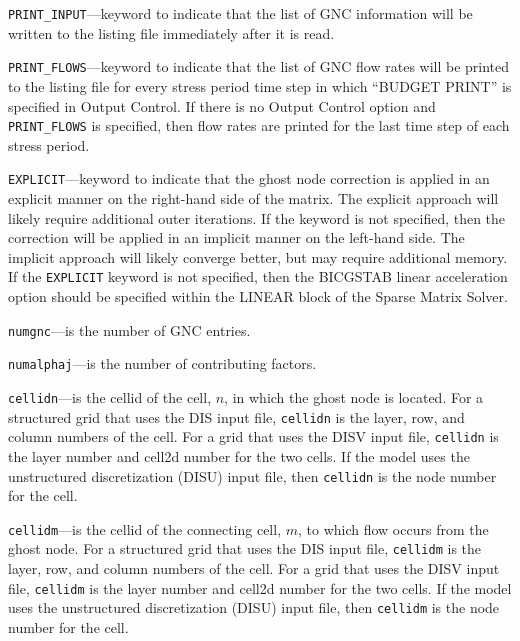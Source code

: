 
\item \texttt{PRINT\_INPUT}---keyword to indicate that the list of GNC information will be written to the listing file immediately after it is read.

\item \texttt{PRINT\_FLOWS}---keyword to indicate that the list of GNC flow rates will be printed to the listing file for every stress period time step in which ``BUDGET PRINT'' is specified in Output Control.  If there is no Output Control option and \texttt{PRINT\_FLOWS} is specified, then flow rates are printed for the last time step of each stress period.

\item \texttt{EXPLICIT}---keyword to indicate that the ghost node correction is applied in an explicit manner on the right-hand side of the matrix.  The explicit approach will likely require additional outer iterations.  If the keyword is not specified, then the correction will be applied in an implicit manner on the left-hand side.  The implicit approach will likely converge better, but may require additional memory.  If the \texttt{EXPLICIT} keyword is not specified, then the BICGSTAB linear acceleration option should be specified within the LINEAR block of the Sparse Matrix Solver.

\item \texttt{numgnc}---is the number of GNC entries.

\item \texttt{numalphaj}---is the number of contributing factors.

\item \texttt{cellidn}---is the cellid of the cell, $n$, in which the ghost node is located. For a structured grid that uses the DIS input file, \texttt{cellidn} is the layer, row, and column numbers of the cell.   For a grid that uses the DISV input file, \texttt{cellidn} is the layer number and cell2d number for the two cells.  If the model uses the unstructured discretization (DISU) input file, then \texttt{cellidn} is the node number for the cell.

\item \texttt{cellidm}---is the cellid of the connecting cell, $m$, to which flow occurs from the ghost node. For a structured grid that uses the DIS input file, \texttt{cellidm} is the layer, row, and column numbers of the cell.   For a grid that uses the DISV input file, \texttt{cellidm} is the layer number and cell2d number for the two cells.  If the model uses the unstructured discretization (DISU) input file, then \texttt{cellidm} is the node number for the cell.

